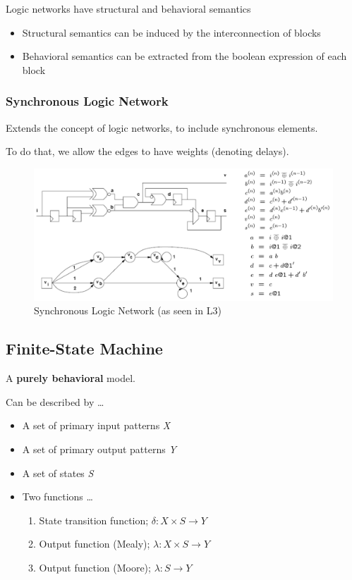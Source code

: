 \documentclass{article}
\begin{document}
\newpage
Logic networks have structural and behavioral semantics
\begin{itemize}
    \item Structural semantics can be induced by the interconnection of blocks
    \item Behavioral semantics can be extracted from the boolean expression of each block
\end{itemize}

\subsubsection{Synchronous Logic Network}
Extends the concept of logic networks, to include synchronous elements.

To do that, we allow the edges to have weights (denoting delays).

\begin{figure}[htp]
    \centering
    \includegraphics[width=15cm, scale=1]{S1/syncNetwork.PNG}
    \caption{Synchronous Logic Network (as seen in L3)}
\end{figure}

\subsection{Finite-State Machine}
A \textbf{purely behavioral} model.

Can be described by \dots
\begin{itemize}
    \item A set of primary input patterns \textit{X}
    \item A set of primary output patterns \textit{Y}
    \item A set of states \textit{S}
    \item Two functions \dots
        \begin{enumerate}
            \item State transition function; $\delta:X\times S \xrightarrow{} Y$
            \item Output function (Mealy); $\lambda:X\times S \xrightarrow{} Y$
            \item Output function (Moore); $\lambda:S \xrightarrow{} Y$
        \end{enumerate}
\end{itemize}
\end{document}
